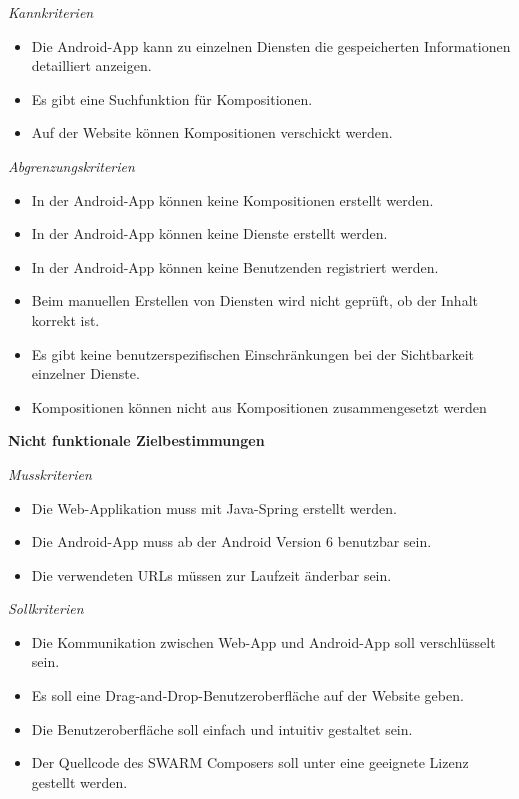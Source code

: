 \textit{Kannkriterien}

\begin{itemize}[leftmargin=4pc]
	\item Die Android-App kann zu einzelnen Diensten die gespeicherten Informationen detailliert anzeigen.
	\item Es gibt eine Suchfunktion für Kompositionen.
	\item Auf der Website können Kompositionen verschickt werden.
\end{itemize}

\textit{Abgrenzungskriterien}

\begin{itemize}[leftmargin=4pc]
	\item In der Android-App können keine Kompositionen erstellt werden.
	\item In der Android-App können keine Dienste erstellt werden.
	\item In der Android-App können keine Benutzenden registriert werden.
	\item Beim manuellen Erstellen von Diensten wird nicht geprüft, ob der Inhalt korrekt ist.
	\item Es gibt keine benutzerspezifischen Einschränkungen bei der Sichtbarkeit einzelner Dienste.
	\item Kompositionen können nicht aus Kompositionen zusammengesetzt werden
\end{itemize}


\textbf{Nicht funktionale Zielbestimmungen}\newline

\textit{Musskriterien}

\begin{itemize}[leftmargin=4pc]
	\item Die Web-Applikation muss mit Java-Spring erstellt werden.
	\item Die Android-App muss ab der Android Version 6 benutzbar sein.
	\item Die verwendeten URLs müssen zur Laufzeit änderbar sein.
\end{itemize}

\textit{Sollkriterien}

\begin{itemize}[leftmargin=4pc]
	\item Die Kommunikation zwischen Web-App und Android-App soll verschlüsselt sein.
	\item Es soll eine Drag-and-Drop-Benutzeroberfläche auf der Website geben.
	\item Die Benutzeroberfläche soll einfach und intuitiv gestaltet sein.
	\item Der Quellcode des SWARM Composers soll unter eine geeignete Lizenz gestellt werden.
\end{itemize}

